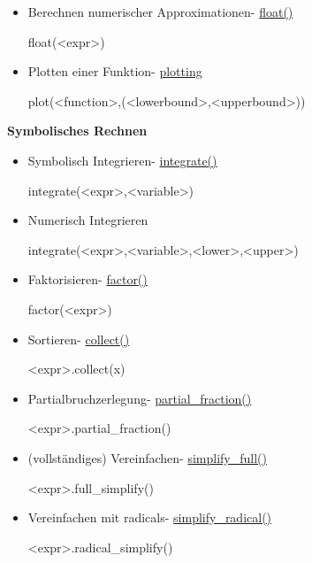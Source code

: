 \documentclass[a4paper,9pt,DIV15,twocolumn]{scrartcl}
\begin{document}
\begin{itemize}
\item Berechnen numerischer Approximationen- \href{http://docs.python.org/library/functions.html#float}{float()}
\begin{sagein}
float(<expr>)
\end{sagein}
\item Plotten einer Funktion- \href{https://sage.math.uni-goettingen.de/doc/static/reference/sage/plot/plot.html?highlight=.plot#d-plotting}{plotting}
\begin{sagein}
plot(<function>,(<lowerbound>,<upperbound>))
\end{sagein}
\end{itemize}

\textbf{Symbolisches Rechnen}
\begin{itemize}
\item Symbolisch Integrieren- \href{https://sage.math.uni-goettingen.de/doc/static/reference/sage/calculus/functional.html?highlight=diff#sage.calculus.functional.integral}{integrate()}
\begin{sagein}
integrate(<expr>,<variable>)
\end{sagein}
 \item Numerisch Integrieren 
\begin{sagein}
integrate(<expr>,<variable>,<lower>,<upper>)
\end{sagein}
\item Faktorisieren- \href{https://sage.math.uni-goettingen.de/doc/static/reference/sage/symbolic/expression.html?highlight=simplify_full#sage.symbolic.expression.Expression.factor}{factor()} 
\begin{sagein}
factor(<expr>)
\end{sagein}
\item Sortieren- \href{https://sage.math.uni-goettingen.de/doc/static/reference/sage/symbolic/expression.html?highlight=simplify_full#sage.symbolic.expression.Expression.collect}{collect()}
\begin{sagein}
<expr>.collect(x)
\end{sagein}
\item Partialbruchzerlegung- \href{https://sage.math.uni-goettingen.de/doc/static/reference/sage/symbolic/expression.html?highlight=simplify_full#sage.symbolic.expression.Expression.partial_fraction}{partial\_fraction()}
\begin{sagein}
<expr>.partial_fraction()
\end{sagein}
\item (vollständiges) Vereinfachen- \href{https://sage.math.uni-goettingen.de/doc/static/reference/sage/symbolic/expression.html?highlight=simplify_full#sage.symbolic.expression.Expression.simplify_full}{simplify\_full()}
\begin{sagein}
<expr>.full_simplify()
\end{sagein}
\item Vereinfachen mit radicals- \href{https://sage.math.uni-goettingen.de/doc/static/reference/sage/symbolic/expression.html?highlight=simplify_full#sage.symbolic.expression.Expression.simplify_radical}{simplify\_radical()}
\begin{sagein}
<expr>.radical_simplify()
\end{sagein}
\end{itemize}
\end{document}
